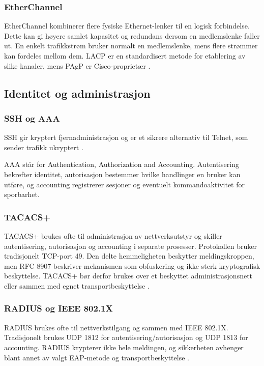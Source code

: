 \subsubsection{EtherChannel}

EtherChannel kombinerer flere fysiske Ethernet-lenker til en logisk forbindelse. Dette kan gi høyere samlet kapasitet og redundans dersom en medlemslenke faller ut. En enkelt trafikkstrøm bruker normalt en medlemslenke, mens flere strømmer kan fordeles mellom dem. LACP er en standardisert metode for etablering av slike kanaler, mens PAgP er Cisco-proprietær \cite{forsvaret_nettverk_rolle1}.

\subsection{Identitet og administrasjon}

\subsubsection{SSH og AAA}

SSH gir kryptert fjernadministrasjon og er et sikrere alternativ til Telnet, som sender trafikk ukryptert \cite{forsvaret_nettverk_rolle1}.

AAA står for Authentication, Authorization and Accounting. Autentisering bekrefter identitet, autorisasjon bestemmer hvilke handlinger en bruker kan utføre, og accounting registrerer sesjoner og eventuelt kommandoaktivitet for sporbarhet.

\subsubsection{TACACS+}

TACACS+ brukes ofte til administrasjon av nettverksutstyr og skiller autentisering, autorisasjon og accounting i separate prosesser. Protokollen bruker tradisjonelt TCP-port 49. Den delte hemmeligheten beskytter meldingskroppen, men RFC 8907 beskriver mekanismen som obfuskering og ikke sterk kryptografisk beskyttelse. TACACS+ bør derfor brukes over et beskyttet administrasjonsnett eller sammen med egnet transportbeskyttelse \cite{rfc8907}.

\subsubsection{RADIUS og IEEE 802.1X}

RADIUS brukes ofte til nettverkstilgang og sammen med IEEE 802.1X. Tradisjonelt brukes UDP 1812 for autentisering/autorisasjon og UDP 1813 for accounting. RADIUS krypterer ikke hele meldingen, og sikkerheten avhenger blant annet av valgt EAP-metode og transportbeskyttelse \cite{rfc2865,rfc2866,rfc3579}.

